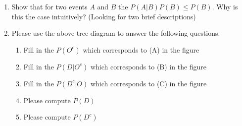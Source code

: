 \documentclass[krantz1,ChapterTOCs]{krantz}
\begin{document}
\begin{enumerate}
   \item Show that for two events $A$ and $B$ the $P(A|B)P(B)  \leq P(B)$. Why is this the case intuitively? (Looking for two brief descriptions)
   \clearpage
   \item \begin{figure}[ht!]
       \centering
   \end{figure} Please use the above tree diagram to answer the following questions. 
   \begin{enumerate}
       \item Fill in the $P(O^{c})$ which corresponds to (A) in the figure
       \item Fill in the $P(D | O^{c})$ which corresponds to (B) in the figure
       \item Fill in the $P(D^{c} | O)$ which corresponds to (C) in the figure
       \item Please compute $P(D)$
       \item Please compute $P(D^{c})$
   \end{enumerate}
   

\end{enumerate}
\end{document}
